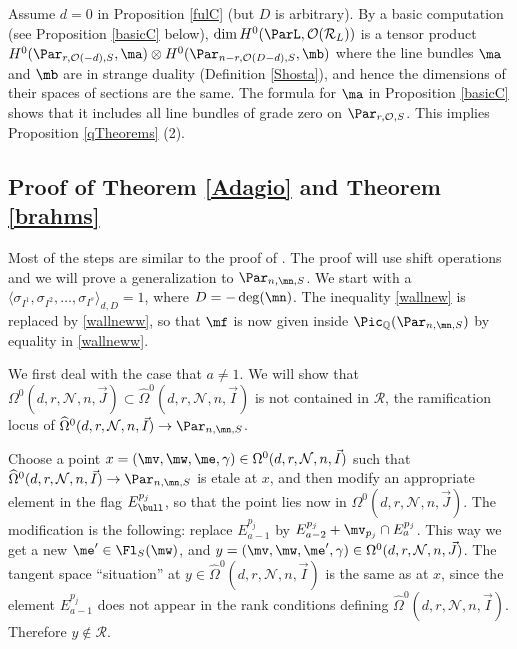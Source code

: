 \begin{remark}
\notready\label{Bee132}
Assume $d=0$ in Proposition \ref{fulC} (but $D$ is arbitrary). By a basic computation (see Proposition \ref{basicC} below), $\dim H^0(\ParL,\mathcal{O}(\mathcal{R}_L))$ is a tensor product
$H^0({\Par}_{r,\mathcal{O}(-d),S},\ma)\otimes H^0({\Par}_{n-r,\mathcal{O}(D-d),S},\mb)$ where the line bundles $\ma$ and $\mb$ are in strange duality (Definition \ref{Shosta}), and hence the dimensions of their spaces of sections are the same. The formula for $\ma$ in Proposition \ref{basicC} shows that it includes all line bundles of grade zero on ${\Par}_{r,\mathcal{O},S}$. This implies Proposition \ref{qTheorems} (2).
\end{remark}

\subsection{Proof of Theorem  \ref{Adagio} and Theorem \ref{brahms}}\label{rumble}
Most of the steps are similar to the proof of \cite[Theorem 1.9]{BHermit}. The proof will use shift operations and we will prove  a generalization to ${\Par}_{n,\mn,S}$. We start with a $\langle\sigma_{I^1}, \sigma_{I^2},\dots,\sigma_{I^s}\rangle_{d,D}=1$, where $D=-\deg(\mn)$.  The inequality \eqref{wallnew} is replaced by \eqref{wallneww}, so that $\mf$ is now given inside  $\Pic_{\Bbb{Q}}({\Par}_{n,\mn,S})$ by equality in \eqref{wallneww}.

We first deal with the case that $a\neq 1$. We will show that $\Omega^0(d,r,\mathcal{N},n,\vec{J})\subset \widehat{\Omega}^0(d,r,\mathcal{N},n,\vec{I})$ is not contained in $\mathcal{R}$, the ramification locus of $\widehat{\Omega}^0(d,r,\mathcal{N},n,\vec{I})\to  {\Par}_{n,\mn,S}$.

Choose a point $x=(\mv,\mw,\me,\gamma)\in\Omega^0(d,r,\mathcal{N},n,\vec{I})$ such that $\widehat{\Omega}^0(d,r,\mathcal{N},n,\vec{I})\to  {\Par}_{n,\mn,S}$ is etale at $x$, and then modify an appropriate element in the flag $E^{p_j}_{\bull}$, so that the point lies now in  $\Omega^0(d,r,\mathcal{N},n,\vec{J})$. The modification is the following: replace  $E^{p_j}_{a-1}$ by $E^{p_j}_{a-2}+\mv_{p_j}\cap E^{p_j}_{a}$. This way we get a new $\me'\in \Fl_S(\mw)$, and $y=(\mv,\mw,\me',\gamma)\in\Omega^0(d,r,\mathcal{N},n,\vec{J})$. The tangent space ``situation'' at $y\in \widehat{\Omega}^0(d,r,\mathcal{N},n,\vec{I})$ is the same as at $x$, since the element $E^{p_j}_{a-1}$ does not appear in the rank conditions defining $\widehat{\Omega}^0(d,r,\mathcal{N},n,\vec{I})$. Therefore $y\not\in\mathcal{R}$.

